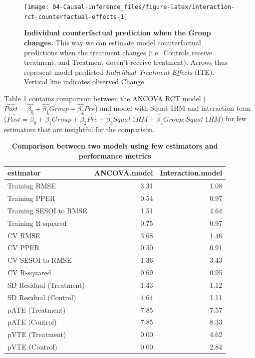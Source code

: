 \documentclass[
]{book}
\begin{document}
\begin{figure}

{\centering \texttt{[image: 04-Causal-inference\_files/figure-latex/interaction-rct-counterfactual-effects-1]} 

}

\caption{\textbf{Individual counterfactual prediction when the Group changes.} This way we can estimate model counterfactual predictions when the treatment changes (i.e.~Controls receive treatment, and Treatment doesn't receive treatment). Arrows thus represent model predicted \emph{Individual Treatment Effects} (ITE). Vertical line indicates observed Change}\label{fig:interaction-rct-counterfactual-effects}
\end{figure}



Table \ref{tab:rct-models-performance-comparison} contains comparison between the ANCOVA RCT model (\(\widehat{Post} = \hat{\beta_0} + \hat{\beta_1}Group + \hat{\beta_2}Pre\)) and model with Squat 1RM and interaction term (\(\widehat{Post} = \hat{\beta_0} + \hat{\beta_1}Group + \hat{\beta_2}Pre + \hat{\beta_3}Squat\:1RM + \hat{\beta_4}Group:Squat\:1RM\)) for few estimators that are insightful for the comparison.



\begin{table}

\caption{\label{tab:rct-models-performance-comparison}\textbf{Comparison between two models using few estimators and performance metrics}}
\centering
\begin{tabular}[t]{lrr}
\toprule
estimator & ANCOVA.model & Interaction.model\\
\midrule
Training RMSE & 3.31 & 1.08\\
Training PPER & 0.54 & 0.97\\
Training SESOI to RMSE & 1.51 & 4.64\\
Training R-squared & 0.75 & 0.97\\
CV RMSE & 3.68 & 1.46\\
\addlinespace
CV PPER & 0.50 & 0.91\\
CV SESOI to RMSE & 1.36 & 3.43\\
CV R-squared & 0.69 & 0.95\\
SD Residual (Treatment) & 1.43 & 1.12\\
SD Residual (Control) & 4.64 & 1.11\\
\addlinespace
pATE (Treatment) & -7.85 & -7.57\\
pATE (Control) & 7.85 & 8.33\\
pVTE (Treatment) & 0.00 & 4.62\\
pVTE (Control) & 0.00 & 2.84\\
\bottomrule
\end{tabular}
\end{table}
\end{document}
